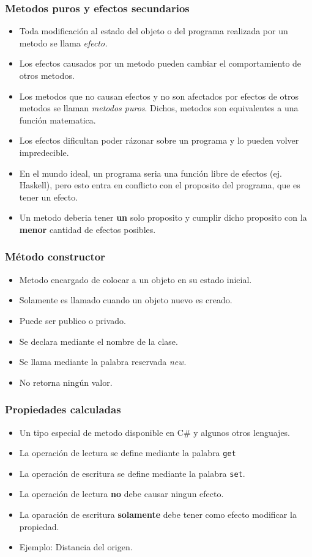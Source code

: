 \documentclass{beamer}
\begin{document}
\begin{frame}
    \frametitle{Metodos puros y efectos secundarios}
    \begin{itemize}
        \item Toda modificaci\'on al estado del objeto o del programa realizada por un metodo se llama \emph{efecto.}
        \item Los efectos causados por un metodo pueden cambiar el comportamiento de otros metodos.
        \item{Los metodos que no causan efectos y no son afectados por efectos de otros metodos
        se llaman \emph{metodos puros}. Dichos, metodos son equivalentes a una funci\'on matematica.}
        \item{Los efectos dificultan poder r\'azonar sobre un programa y lo pueden volver impredecible.}
        \item{En el mundo ideal, un programa seria una funci\'on libre de efectos (ej. Haskell\cite{Haskell}),
        pero esto entra en conflicto con el proposito del programa, que es tener un efecto.}
        \item{Un metodo deberia tener {\bf un} solo proposito y cumplir dicho proposito
        con la {\bf menor} cantidad de efectos posibles.}
    \end{itemize}
\end{frame}

\begin{frame}
\frametitle{M\'etodo constructor}
\begin{itemize}
    \item Metodo encargado de colocar a un objeto en su estado inicial.
    \item Solamente es llamado cuando un objeto nuevo es creado.
    \item Puede ser publico o privado.
    \item Se declara mediante el nombre de la clase.
    \item Se llama mediante la palabra reservada \emph{new}.
    \item{No retorna ning\'un valor.}
\end{itemize}
\end{frame}

\begin{frame}
\frametitle{Propiedades calculadas}
    \begin{itemize}
        \item Un tipo especial de metodo disponible en C\# y algunos otros lenguajes.
        \item La operaci\'on de lectura se define mediante la palabra \texttt{get}
        \item La operaci\'on de escritura se define mediante la palabra \texttt{set}.
        \item La operaci\'on de lectura {\bf no} debe causar ningun efecto.
        \item La oparaci\'on de escritura {\bf solamente} debe tener como efecto modificar la propiedad.
        \item Ejemplo: Distancia del origen.
    \end{itemize}
\end{frame}
\end{document}
